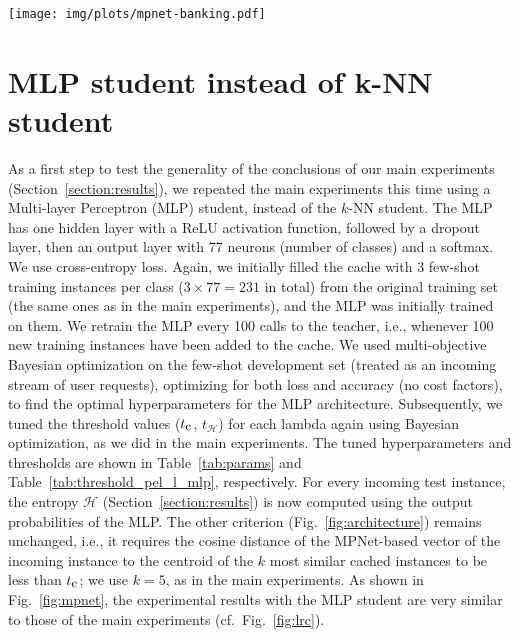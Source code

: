 \documentclass[11pt]{article}
\begin{document}
\begin{figure*}[!htbp]

\centering
{
    \texttt{[image: img/plots/mpnet-banking.pdf]}
    \caption{
    Number of calls to the teacher (left),  accuracy (middle), and discounted accuracy (right), using a GPT-4 teacher and an \textbf{MLP student}, for various $\lambda$ values, on Banking77 data. In the left sub-figure, the green line (OCaTS, $\lambda = 0.2$) is not visible, because it overlaps with the purple one (OCaTS, $\lambda = 0.3$). The results are very similar to those of the main experiments (cf.\ Fig.~\ref{fig:lrc}). Again, OCaTS (right, solid lines) has better discounted accuracy than always calling the teacher (right, dashed lines) for all four indicative $\lambda$ values. The larger the $\lambda$, the fewer the calls to the teacher (left), at the expense of reduced accuracy (middle).}
    \label{fig:mpnet}
    
}
\end{figure*}

\section{MLP student instead of k-NN student} \label{sec:mlp}

As a first step to test the generality of the conclusions of our main experiments (Section~\ref{section:results}), we repeated the main experiments this time using a Multi-layer Perceptron (MLP) student, instead of the $k$-NN student. The MLP has one hidden 
layer with a ReLU activation function, followed by a dropout layer, then an output layer with 77 neurons (number of classes) and a softmax. We use cross-entropy loss. 
Again, we initially filled the cache with 3 few-shot training instances per class ($3 \times 77 = 231$ in total) from the original training set (the same ones as in the main experiments), and the MLP was initially trained on them. 
We retrain the MLP every 100 calls to the teacher, i.e., whenever 100 new training instances have been added to the cache. We used multi-objective Bayesian optimization on the few-shot development set (treated as an incoming stream of user requests), optimizing for both loss and accuracy (no cost factors), to find the optimal hyperparameters for the MLP architecture. Subsequently, we tuned the threshold values ($t_{\textrm{\small c}}$, $t_\mathcal{H}$) for each lambda again using Bayesian optimization, as we did in the main experiments. The tuned hyperparameters and thresholds are shown in Table~\ref{tab:params} and Table~\ref{tab:threshold_pel_l_mlp}, respectively.
For every incoming test instance, the entropy $\mathcal{H}$ (Section~\ref{section:results}) is now computed using the output probabilities of the MLP. The other criterion (Fig.~\ref{fig:architecture}) remains unchanged, i.e., it requires the cosine distance of the MPNet-based vector of the incoming instance to the centroid of the $k$ most similar cached instances to be less than $t_{\textrm{\small c}}$; we use $k=5$, as in the main experiments. 
As shown in Fig.~\ref{fig:mpnet}, the experimental results with the MLP student are very similar to those of the main experiments (cf.\ Fig.~\ref{fig:lrc}). 
\end{document}
